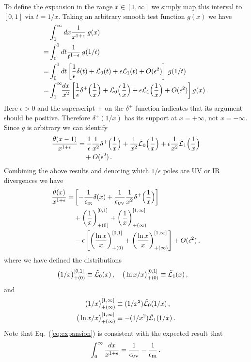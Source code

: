 \documentclass[prd,aps,twocolumn,preprintnumbers,showpacs,nofootinbib,superscriptaddress,notitlepage]{revtex4-1}
\newcommand{\nn}{\nonumber}
\DeclareRobustCommand{\eq}[1]{Eq.~(\ref{eq:#1})}
\begin{document}
To define the expansion in the range $x\in [1,\infty]$ we simply map this interval to $[0,1]$ via $t=1/x$. Taking an arbitrary smooth test function $g(x)$ we have
\begin{align}
	&\int_1^\infty dx {1\over x^{1+\epsilon}} \: g(x)
    \\
	=& \int_0^1 dt {1\over t^{1-\epsilon}}  \:  g(1/t)
   \nn\\
	=& \int_0^1 dt \left[{1\over\epsilon}\delta(t)+ \mathcal{L}_0(t) + \epsilon \mathcal{L}_1(t)+ O(\epsilon^2)\right] \, g(1/t)
    \nn\\
	=& \int_1^\infty\!\! {dx\over x^2}\left[{1\over\epsilon}\delta^+\Bigl({1\over x}\Bigr)+ \mathcal{L}_0\Bigl({1\over x}\Bigr) + \epsilon \mathcal{L}_1\Bigl({1\over x}\Bigr)+ O(\epsilon^2)\right] g(x)
   \,.\nn
\end{align}
Here $\epsilon>0$ and the superscript $+$ on the $\delta^+$ function indicates that its argument should be positive. Therefore $\delta^+(1/x)$ has its support at $x=+\infty$, not $x=-\infty$.  Since $g$ is arbitrary we can identify
\begin{align}
  {\theta(x-1)\over x^{1+\epsilon}}
   &= {1\over\epsilon}{1\over x^2}\delta^+\Bigl({1\over x}\Bigr)
   + \frac{1}{x^2} \tilde{\mathcal{L}}_0\Bigl({1\over x}\Bigr)
   + \epsilon \frac{1}{x^2} \tilde{\mathcal{L}}_1\Bigl({1\over x}\Bigr)
  \nn\\
  &\quad + O(\epsilon^2)\,.
\end{align}
Combining the above results and denoting which $1/\epsilon$ poles are UV or IR divergences we have
\begin{align} \label{eq:expansion}
	{\theta(x)\over x^{1+\epsilon}}
 = & \left[-\frac{1}{\epsilon_{\mbox{\tiny IR}}}\delta(x) + \frac{1}{\epsilon_{\mbox{\tiny UV}}} {1\over  x^2}\delta^+\Bigl({1\over x}\Bigr)\right]
    \\
    & + \left({1\over x}\right)^{[0,1]}_{+(0)}+\left({1\over x}\right)^{[1,\infty]}_{+(\infty)}
  \nn\\
	& - \epsilon\left[\left({\ln x\over x}\right)^{[0,1]}_{+(0)}+\left({\ln x\over x}\right)^{[1,\infty]}_{+(\infty)}\right] + O(\epsilon^2)
   \,, \nn
\end{align}
where we have defined the distributions
\begin{align}
  \big(1/x\big)_{+(0)}^{[0,1]} &\equiv  \tilde{{\cal L}}_0(x)
  \,,  \quad
  \big(\ln x/x\big)_{+(0)}^{[0,1]} \equiv  \tilde{{\cal L}}_1(x)
  \,,
\end{align}
and
\begin{align}\label{eq:plusinfinity}
 \big(1/x\big)_{+(\infty)}^{[1,\infty]} &\equiv (1/x^2) \tilde{{\cal L}}_0(1/x)
  \,,\nn \\
\big(\ln x/x\big)_{+(\infty)}^{[1,\infty]} &\equiv -(1/x^2) \tilde{{\cal L}}_1(1/x)
  \,.
\end{align}
Note that \eq{expansion} is consistent with the expected result that
\begin{align}
 \int_0^\infty \frac{dx}{x^{1+\epsilon}}
 = \frac{1}{\epsilon_{\mbox{\tiny UV}} }
  -\frac{1}{\epsilon_{\mbox{\tiny IR}} } \,.
\end{align}






\end{document}
